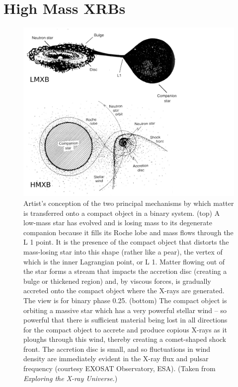 \section{High Mass XRBs}

\begin{figure}[ht!]
    \centering
    \includegraphics[width=1\linewidth]{Pictures/figures/hmxb_image.png}
    \caption{\small Artist’s conception of the two principal mechanisms by which matter is transferred onto a compact object in a binary
system. (top) A low-mass star has evolved and is losing mass to its degenerate companion because it fills its Roche lobe and mass
flows through the L 1 point. It is the presence of the compact object that distorts the mass-losing star into this shape (rather like a
pear), the vertex of which is the inner Lagrangian point, or L 1. Matter flowing out of the star forms a stream that impacts the
accretion disc (creating a bulge or thickened region) and, by viscous forces, is gradually accreted onto the compact object where
the X-rays are generated. The view is for binary phase 0.25. (bottom) The compact object is orbiting a massive star which has a
very powerful stellar wind – so powerful that there is sufficient material being lost in all directions for the compact object to
accrete and produce copious X-rays as it ploughs through this wind, thereby creating a comet-shaped shock front. The accretion
disc is small, and so fluctuations in wind density are immediately evident in the X-ray flux and pulsar frequency (courtesy EXOSAT
Observatory, ESA). (Taken from \textit{Exploring the X-ray Universe}.)}
    \label{fig:hmxb_image}
\end{figure}

